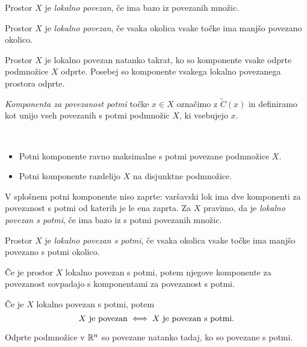 \begin{definicija}
    Prostor $X$ je \emph{lokalno povezan}, če ima bazo iz povezanih množic.
\end{definicija}

\begin{opomba}
    Prostor $X$ je \emph{lokalno povezan}, če vsaka okolica vsake točke ima manjšo povezano okolico.
\end{opomba}

\begin{trditev}
    Prostor $X$ je lokalno povezan natanko takrat, ko so komponente vsake odprte podmnožice $X$ odprte. Posebej so komponente vsakega lokalno povezanega prostora odprte.
\end{trditev}

\emph{Komponenta za povezanost potmi} točke $x \in X$ označimo z $\widetilde{C}(x)$ in definiramo kot unijo vseh povezanih s potmi podmnožic $X$, ki vsebujejo $x$.

\begin{opomba}
    \ 
    \begin{itemize}
        \item Potni komponente ravno maksimalne s potmi povezane podmnožice $X$.
        \item Potni komponente razdelijo $X$ na disjunktne podmnožice.
    \end{itemize}

    V splošnem potni komponente niso zaprte: varšavski lok ima dve komponenti za povezanost s potmi od katerih je le ena zaprta. Za $X$ pravimo, da je \emph{lokalno povezan s potmi}, če ima bazo iz s potmi povezanih množic.
\end{opomba}

\begin{opomba}
    Prostor $X$ je \emph{lokalno povezan s potmi}, če vsaka okolica vsake točke ima manjšo povezano s potmi okolico.
\end{opomba}

\begin{izrek}
    Če je prostor $X$ lokalno povezan s potmi, potem njegove komponente za povezanost sovpadajo s komponentami za povezanost s potmi.
\end{izrek}

\begin{posledica}
    Če je $X$ lokalno povezan s potmi, potem 
    $$X \text{ je povezan} \iff X \text{ je povezan s potmi}.$$
\end{posledica}

\begin{posledica}
    Odprte podmnožice v $\mathbb{R}^n$ so povezane natanko tadaj, ko so povezane s potmi.
\end{posledica}

